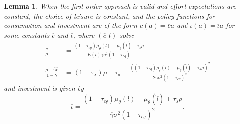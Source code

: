 \documentclass[11pt]{article}
\theoremstyle{plain}
\newtheorem{lemma}[thm]{Lemma}
\begin{document}
\begin{lemma}\label{MertonSam}
When the first-order approach is valid and effort expectations are constant, the choice of leisure is constant, and the policy functions for consumption and investment are of the form $c(a) = \overline{c}a$ and $\iota(a) = \overline{\iota}a$ for some constants $\overline{c}$ and $\overline{\iota}$, where $(\overline{c}, l)$ solve 
\begin{equation}
\begin{aligned}
\frac{\overline{c}}{\rho} & = \frac{(1 - \tau_{cg})\mu_{\theta}(l) - \mu_{\theta}(\hat{l}) + \tau_s\rho}{E(l)\overline{\gamma}\sigma^2(1-\tau_{cg})}
\\ \frac{\rho - \overline{\gamma}\overline{c}}{1-\overline{\gamma}} & = (1-\tau_s)\rho - \tau_a  + \frac{((1 - \tau_{cg})\mu_{\theta}(l) - \mu_{\theta}(\hat{l}) + \tau_s\rho)^2}{2\overline{\gamma}\sigma^2(1-\tau_{cg})^2}
 \end{aligned}
\label{3by34}
\end{equation}
and investment is given by
$$
\overline{\iota} = \frac{(1 - \tau_{cg})\mu_{\theta}(l) - \mu_{\theta}(\hat{l}) + \tau_s\rho}{\overline{\gamma}\sigma^2(1-\tau_{cg})^2}.
$$
\end{lemma}
\end{document}

